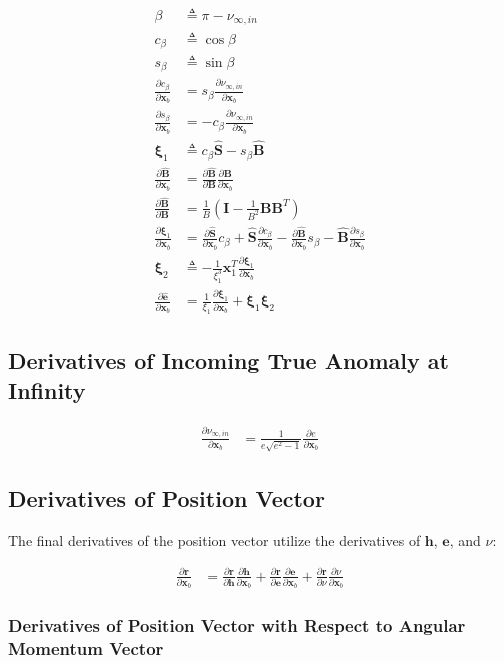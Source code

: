 \documentclass[]{article}
\newcommand{\vb}[1]{\bm{#1}} %
\newcommand{\vbh}[1]{\hat{\bm{#1}}} %
\newcommand{\pd}[2]{\frac{\partial #1}{\partial #2}} %
\newcommand{\xb}[0]{\vb{x}_b}
\begin{document}
\begin{align}
	\beta &\triangleq \pi - \nu_{\infty,in} \\
	c_\beta &\triangleq \cos \beta \\
	s_\beta &\triangleq \sin \beta \\
	\pd{c_\beta}{\xb} &= s_\beta \pd{\nu_{\infty,in}}{\xb} \\
	\pd{s_\beta}{\xb} &= -c_\beta \pd{\nu_{\infty,in}}{\xb} \\
	\vb{\xi}_1 &\triangleq c_\beta \vbh{S} - s_\beta \vbh{B} \\
	\pd{\vbh{B}}{\xb} &= \pd{\vbh{B}}{\vb{B}} \pd{\vb{B}}{\xb} \\
	\pd{\vbh{B}}{\vb{B}} &= \frac{1}{B} \left( \vb{I} - \frac{1}{B^2} \vb{B} \vb{B}^T \right) \\
	\pd{\vb{\xi}_1}{\xb} &= \pd{\vbh{S}}{\xb} c_\beta + \vbh{S} \pd{c_\beta}{\xb}  - \pd{\vbh{B}}{\xb} s_\beta - \vbh{B} \pd{s_\beta}{\xb}  \\
	\vb{\xi}_2 &\triangleq -\frac{1}{\xi_1^3} \vb{x}_1^T \pd{\vb{\xi}_1}{\xb} \\
	\label{eq:d_ehat_in_d_xb}
	\pd{\vbh{e}}{\xb} &= \frac{1}{\xi_1} \pd{\vb{\xi}_1}{\xb} + \vb{\xi}_1 \vb{\xi}_2
\end{align}



\subsection{Derivatives of Incoming True Anomaly at Infinity}

\begin{align}
	\label{eq:d_nuinf_in_d_xb}
	\pd{\nu_{\infty,in}}{\xb} &= \frac{1}{e \sqrt{e^2 - 1}} \pd{e}{\xb}
\end{align}

\subsection{Derivatives of Position Vector}

The final derivatives of the position vector utilize the derivatives of $\vb{h}$, $\vb{e}$, and $\nu$:

\begin{align}
\pd{\vb{r}}{\xb} &= \pd{\vb{r}}{\vb{h}} \pd{\vb{h}}{\xb} + \pd{\vb{r}}{\vb{e}} \pd{\vb{e}}{\xb} + \pd{\vb{r}}{\nu} \pd{\nu}{\xb}
\end{align}

\subsubsection{Derivatives of Position Vector with Respect to Angular Momentum Vector}
\end{document}
